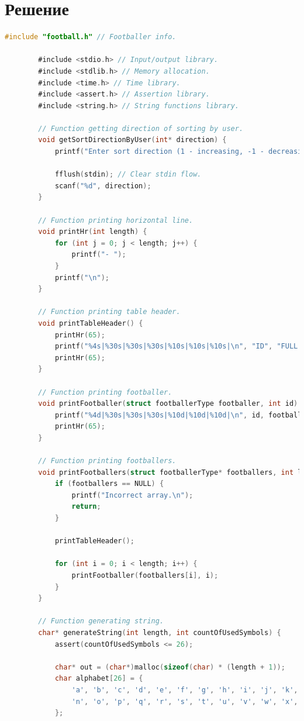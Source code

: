 \documentclass[12pt]{article}
\begin{document}
	\section{Решение}
	
	\begin{lstlisting}[language=C]
		#include "football.h" // Footballer info.
		
		#include <stdio.h> // Input/output library.
		#include <stdlib.h> // Memory allocation.
		#include <time.h> // Time library.
		#include <assert.h> // Assertion library.
		#include <string.h> // String functions library.
		
		// Function getting direction of sorting by user.
		void getSortDirectionByUser(int* direction) {
			printf("Enter sort direction (1 - increasing, -1 - decreasing): ");
			
			fflush(stdin); // Clear stdin flow.
			scanf("%d", direction);
		}
		
		// Function printing horizontal line.
		void printHr(int length) {
			for (int j = 0; j < length; j++) {
				printf("- ");
			}
			printf("\n");
		}
		
		// Function printing table header.
		void printTableHeader() {
			printHr(65);
			printf("%4s|%30s|%30s|%30s|%10s|%10s|%10s|\n", "ID", "FULL NAME", "CLUB NAME", "ROLE", "AGE", "GAMES", "GOALS");
			printHr(65);
		}
		
		// Function printing footballer.
		void printFootballer(struct footballerType footballer, int id) {
			printf("%4d|%30s|%30s|%30s|%10d|%10d|%10d|\n", id, footballer.fullName, footballer.clubName, footballer.role, footballer.age, footballer.numberOfGames, footballer.numberOfGoals);
			printHr(65);
		}
		
		// Function printing footballers.
		void printFootballers(struct footballerType* footballers, int length) {
			if (footballers == NULL) {
				printf("Incorrect array.\n");
				return;
			}
			
			printTableHeader();
			
			for (int i = 0; i < length; i++) {
				printFootballer(footballers[i], i);
			}
		}
		
		// Function generating string.
		char* generateString(int length, int countOfUsedSymbols) {
			assert(countOfUsedSymbols <= 26);
			
			char* out = (char*)malloc(sizeof(char) * (length + 1));
			char alphabet[26] = {
				'a', 'b', 'c', 'd', 'e', 'f', 'g', 'h', 'i', 'j', 'k', 'l', 'm',
				'n', 'o', 'p', 'q', 'r', 's', 't', 'u', 'v', 'w', 'x', 'y', 'z'
			};
			

\end{lstlisting}
\end{document}
